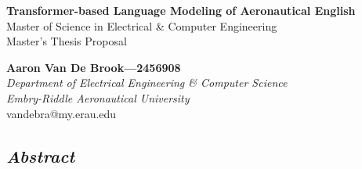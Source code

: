\documentclass[10pt]{article}
\begin{document}
    \begin{center}
        \LARGE
        \textbf{Transformer-based Language Modeling of Aeronautical English}\\
        \Large
        Master of Science in Electrical \& Computer Engineering\\
        Master's Thesis Proposal\\

        \vspace*{0.25in}

        \normalsize
        \textbf{Aaron Van De Brook---2456908}\\
        \textit{Department of Electrical Engineering \& Computer Science}\\
        \textit{Embry-Riddle Aeronautical University}\\
        vandebra@my.erau.edu
    \end{center}

    \begin{center}
        \section*{\textit{Abstract}}
        \noindent
        \justifying
        \textit{
            \lipsum[1]
        }
    \end{center}

\end{document}
